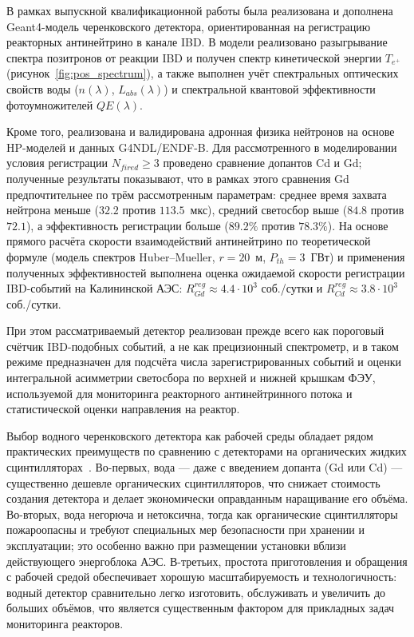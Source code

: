 \documentclass[a4paper,12pt]{extarticle}
\begin{document}
В рамках выпускной квалификационной работы была реализована и дополнена Geant4-модель черенковского детектора, ориентированная на регистрацию реакторных антинейтрино в канале IBD. В модели реализовано разыгрывание спектра позитронов от реакции IBD и получен спектр кинетической энергии $T_{e^+}$ (рисунок~\ref{fig:pos_spectrum}), а также выполнен учёт спектральных оптических свойств воды ($n(\lambda)$, $L_{abs}(\lambda)$) и спектральной квантовой эффективности фотоумножителей $QE(\lambda)$.

Кроме того, реализована и валидирована адронная физика нейтронов на основе HP-моделей и данных G4NDL/ENDF-B. Для рассмотренного в моделировании условия регистрации $N_{fired}\ge 3$ проведено сравнение допантов Cd и Gd; полученные результаты показывают, что в рамках этого сравнения Gd предпочтительнее по трём рассмотренным параметрам: среднее время захвата нейтрона меньше ($32.2$ против $113.5$~мкс), средний светосбор выше ($84.8$ против $72.1$), а эффективность регистрации больше ($89.2\%$ против $78.3\%$). На основе прямого расчёта скорости взаимодействий антинейтрино по теоретической формуле (модель спектров Huber–Mueller, $r=20$~м, $P_{th}=3$~ГВт) и применения полученных эффективностей выполнена оценка ожидаемой скорости регистрации IBD-событий на Калининской АЭС: $R^{reg}_{Gd}\approx 4.4\cdot 10^{3}$ соб./сутки и $R^{reg}_{Cd}\approx 3.8\cdot 10^{3}$ соб./сутки.

При этом рассматриваемый детектор реализован прежде всего как пороговый счётчик IBD-подобных событий, а не как прецизионный спектрометр, и в таком режиме предназначен для подсчёта числа зарегистрированных событий и оценки интегральной асимметрии светосбора по верхней и нижней крышкам ФЭУ, используемой для мониторинга реакторного антинейтринного потока и статистической оценки направления на реактор.

Выбор водного черенковского детектора как рабочей среды обладает рядом практических преимуществ по сравнению с детекторами на органических жидких сцинтилляторах~\cite{bernstein2020}. Во-первых, вода --- даже с введением допанта (Gd или Cd) --- существенно дешевле органических сцинтилляторов, что снижает стоимость создания детектора и делает экономически оправданным наращивание его объёма. Во-вторых, вода негорюча и нетоксична, тогда как органические сцинтилляторы пожароопасны и требуют специальных мер безопасности при хранении и эксплуатации; это особенно важно при размещении установки вблизи действующего энергоблока АЭС. В-третьих, простота приготовления и обращения с рабочей средой обеспечивает хорошую масштабируемость и технологичность: водный детектор сравнительно легко изготовить, обслуживать и увеличить до больших объёмов, что является существенным фактором для прикладных задач мониторинга реакторов.
\end{document}
